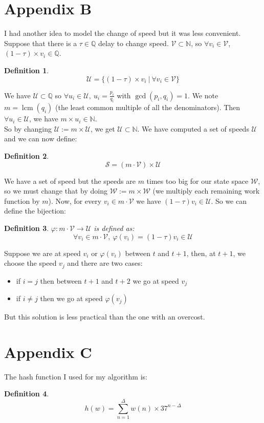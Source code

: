 \documentclass[
10pt, %
a4paper, %
oneside, %
headinclude,footinclude, %
BCOR5mm, %
]{scrartcl}
\DeclareMathOperator{\lcm}{lcm}
\newcommand{\N}{\mathbb{N}}
\newcommand{\V}{\mathcal{V}}
\newcommand{\U}{\mathcal{U}}
\newcommand{\Sp}{\mathcal{S}}
\newcommand{\W}{\mathcal{W}}
\newcommand{\Q}{\mathbb{Q}}
\newtheorem{defi}{Definition}
\begin{document}
\section*{Appendix B}

I had another idea to model the change of speed but it was less
convenient. Suppose that there is a $\tau\in\Q$ delay to change
speed. $\V\subset\N$, so $\forall v_i\in\V$, $(1-\tau)\times
v_i\in\Q$.\\

\begin{defi}
  \[
    \U=\{(1-\tau)\times v_i~|~\forall v_i\in\V\}
  \]
\end{defi}

We have $\U\subset\Q$ so $\forall u_i\in\U,~u_i=\frac{p_i}{q_i}$ with
$\gcd(p_i,q_i)=1$. We note $m=\lcm(q_i)$ (the least common multiple of
all the denominators). Then $\forall u_i\in\U$, we have $m\times
u_i\in\N$.\\

So by changing $\U:=m\times \U$, we get $\U\subset\N$. We have
computed a set of speeds $\U$ and we can now define:\\
\begin{defi}
  \[
    \Sp=(m\cdot\V)\times \U
  \]
\end{defi}

We have a set of speed but the speeds are $m$ times too big for our
state space $\W$, so we must change that by doing $\W:=m\times
\W$ (we multiply each remaining work function by $m$).
Now, for every $v_i\in m\cdot\V$ we have
$(1-\tau)v_i\in\U$. So we can define the bijection:\\

\begin{defi}
  $\varphi:m\cdot\V\rightarrow\U$ is defined as:
  \[
    \forall v_i\in m\cdot\V,~\varphi(v_i)=(1-\tau)v_i\in\U
  \]
\end{defi}

Suppose we are at speed $v_i$ or $\varphi(v_i)$ between $t$ and $t+1$,
then, at $t+1$, we choose the speed $v_j$ and there are two cases:
\begin{itemize}
\item if $i=j$ then between $t+1$ and $t+2$ we go at speed $v_j$
\item if $i\neq j$ then we go at speed $\varphi(v_j)$
\end{itemize}

But this solution is less practical than the one with an overcost.

\section*{Appendix C}
\label{sec:hashfun}

The hash function I used for my algorithm is:

\begin{defi}
  \[
    h(w) = \sum_{n=1}^\Delta w(n)\times 37^{n-\Delta}
  \]
\end{defi}
\end{document}
